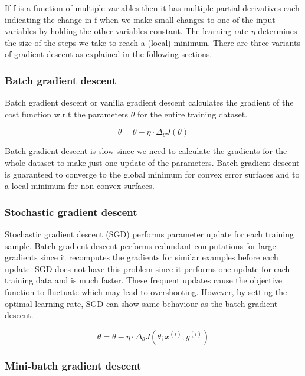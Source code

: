 \documentclass[a4paper, 12pt, oneside, BCOR1cm,toc=chapterentrywithdots]{scrbook}
\begin{document}
If f is a function of multiple variables then it has multiple partial derivatives each indicating the change in f when we make small changes to one of the input variables by holding the other variables constant. The learning rate $\eta$ determines the size of the steps we take to reach a (local) minimum. There are three variants of gradient descent as explained in the following sections.

\subsubsection{Batch gradient descent}

Batch gradient descent or vanilla gradient descent calculates the gradient of the cost function w.r.t the parameters $\theta$ for the entire training dataset. 

\begin{equation} \label{eqn:3}
\theta = \theta - \eta \cdot \Delta_{\theta} J(\theta)
\end{equation}

Batch gradient descent is slow since we need to calculate the gradients for the whole dataset to make just one update of the parameters. Batch gradient descent is guaranteed to converge to the global minimum for convex error surfaces and to a local minimum for non-convex surfaces.

\subsubsection{Stochastic gradient descent}

Stochastic gradient descent (SGD) performs parameter update for each training sample. Batch gradient descent performs redundant computations for large gradients since it recomputes the gradients for similar examples before each update. SGD does not have this problem since it performs one update for each training data and is much faster. These frequent updates cause the objective function to fluctuate which may lead to overshooting. However, by setting the optimal learning rate, SGD can show same behaviour as the batch gradient descent.

\begin{equation} \label{eqn:4}
\theta = \theta - \eta \cdot \Delta_{\theta} J(\theta; x^{(i)}; y^{(i)})
\end{equation}


\subsubsection{Mini-batch gradient descent}
\end{document}
